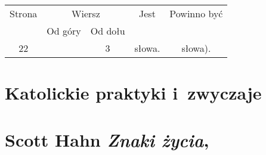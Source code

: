 \documentclass[a4paper,11pt]{article}
\numberwithin{equation}{section}
\begin{document}
\begin{center}

  \begin{tabular}{|c|c|c|c|c|}
    \hline
    Strona & \multicolumn{2}{c|}{Wiersz} & Jest
                              & Powinno być \\ \cline{2-3}
    & Od góry & Od dołu & & \\
    \hline
    22  & &  3 & słowa. & słowa). \\
    \hline
  \end{tabular}

\end{center}














\newpage

\section{Katolickie praktyki i~zwyczaje}

\VerSpaceTwo



\section{Scott Hahn \textit{Znaki życia}, \parencite{}}

\end{document}
